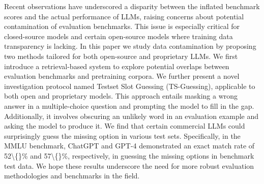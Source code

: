 Recent observations have underscored a disparity between the inflated benchmark scores and the actual performance of LLMs, raising concerns about potential contamination of evaluation benchmarks. This issue is especially critical for closed-source models and certain open-source models where training data transparency is lacking. In this paper we study data contamination by proposing two methods tailored for both open-source and proprietary LLMs. We first introduce a retrieval-based system to explore potential overlaps between evaluation benchmarks and pretraining corpora. We further present a novel investigation protocol named Testset Slot Guessing (TS-Guessing), applicable to both open and proprietary models. This approach entails masking a wrong answer in a multiple-choice question and prompting the model to fill in the gap. Additionally, it involves obscuring an unlikely word in an evaluation example and asking the model to produce it. We find that certain commercial LLMs could surprisingly guess the missing option in various test sets. Specifically, in the MMLU benchmark, ChatGPT and GPT-4 demonstrated an exact match rate of 52\textbackslash\{\}\% and 57\textbackslash\{\}\%, respectively, in guessing the missing options in benchmark test data. We hope these results underscore the need for more robust evaluation methodologies and benchmarks in the field.